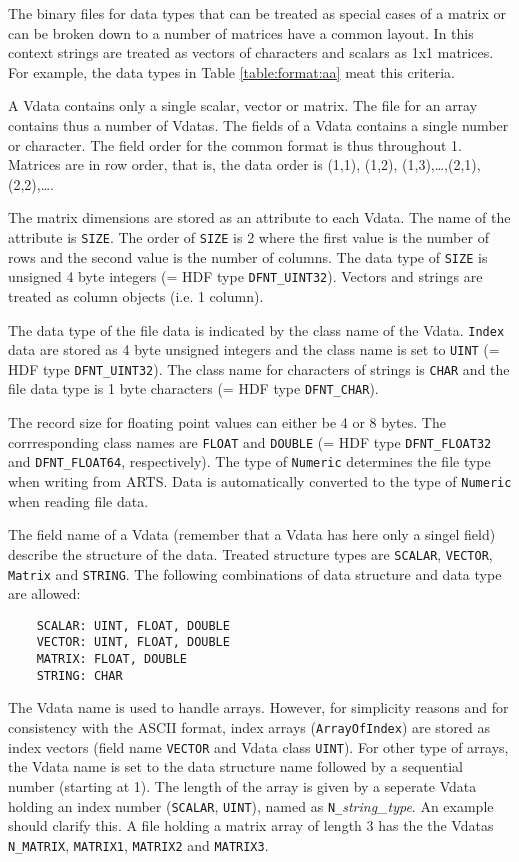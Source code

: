  The binary files for data types that can be treated as special cases
 of a matrix or can be broken down to a number of matrices have a
 common layout. In this context strings are treated as vectors of
 characters and scalars as 1x1 matrices. For example, the data types
 in Table \ref{table:format:aa} meat this criteria.
 
 A Vdata contains only a single scalar, vector or matrix. The file for
 an array contains thus a number of Vdatas. The fields of a Vdata
 contains a single number or character. The field order for the common
 format is thus throughout 1. Matrices are in row order, that is, 
 the data order is (1,1), (1,2), (1,3),\dots,(2,1),(2,2),\dots.
 
 The matrix dimensions are stored as an attribute to each Vdata. The
 name of the attribute is \verb|SIZE|. The order of \verb|SIZE| is 2
 where the first value is the number of rows and the second value is
 the number of columns. The data type of \verb|SIZE| is unsigned 4 byte
 integers (= HDF type \verb|DFNT_UINT32|). Vectors and strings are
 treated as column objects (i.e. 1 column).
 
 The data type of the file data is indicated by the class name of the
 Vdata. \verb|Index| data are stored as 4 byte unsigned integers and
 the class name is set to \verb|UINT| (= HDF type \verb|DFNT_UINT32|).
 The class name for characters of strings is \verb|CHAR| and the file
 data type is 1 byte characters (= HDF type \verb|DFNT_CHAR|).

 The record size for floating point values can either be 4 or 8 bytes.
 The corrresponding class names are \verb|FLOAT| and \verb|DOUBLE|
 (= HDF type \verb|DFNT_FLOAT32| and \verb|DFNT_FLOAT64|, respectively).
 The type of \verb|Numeric| determines the file type when writing from
 ARTS. Data is automatically converted to the type of \verb|Numeric|
 when reading file data.
 
 The field name of a Vdata (remember that a Vdata has here only a
 singel field) describe the structure of the data. Treated structure
 types are \verb|SCALAR|, \verb|VECTOR|, \verb|Matrix| and \verb|STRING|.
 The following combinations of data structure and data type are allowed:
 \begin{verbatim}
    SCALAR: UINT, FLOAT, DOUBLE 
    VECTOR: UINT, FLOAT, DOUBLE 
    MATRIX: FLOAT, DOUBLE 
    STRING: CHAR
 \end{verbatim} 
 The Vdata name is used to handle arrays. However, for simplicity
 reasons and for consistency with the ASCII format, index arrays
 (\verb|ArrayOfIndex|) are stored as index vectors (field name
 \verb|VECTOR| and Vdata class \verb|UINT|). For other type of
 arrays, the Vdata name is set to the data structure name followed
 by a sequential number (starting at 1). The length of the array
 is given by a seperate Vdata holding an index number (\verb|SCALAR|,
 \verb|UINT|), named as \verb|N_|{\it string\_type}. An example should
 clarify this. A file holding a matrix array of length 3 has the
 the Vdatas \verb|N_MATRIX|, \verb|MATRIX1|, \verb|MATRIX2| and
 \verb|MATRIX3|.

